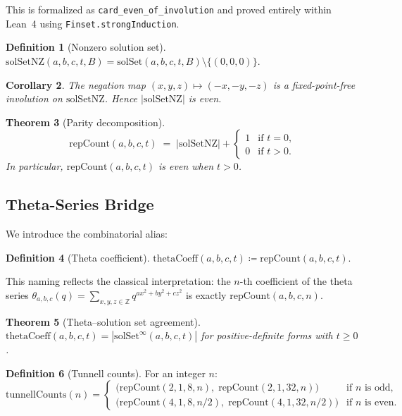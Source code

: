 \documentclass[11pt,a4paper]{article}
\newtheorem{theorem}{Theorem}[section]
\newtheorem{corollary}[theorem]{Corollary}
\theoremstyle{definition}
\newtheorem{definition}[theorem]{Definition}
\newcommand{\Z}{\mathbb{Z}}
\newcommand{\lean}[1]{\texttt{#1}}
\newcommand{\solSet}{\mathrm{solSet}}
\newcommand{\repCount}{\mathrm{repCount}}
\newcommand{\solSetInf}{\mathrm{solSet}^{\infty}}
\begin{document}
This is formalized as \lean{card\_even\_of\_involution} and
proved entirely within Lean~4 using \lean{Finset.strongInduction}.

\begin{definition}[Nonzero solution set]
$\mathrm{solSetNZ}(a,b,c,t,B) = \solSet(a,b,c,t,B) \setminus \{(0,0,0)\}$.
\end{definition}

\begin{corollary}\label{cor:even-nonzero}
The negation map $(x,y,z) \mapsto (-x,-y,-z)$ is a
fixed-point-free involution on $\mathrm{solSetNZ}$.  Hence
$|\mathrm{solSetNZ}|$ is even.
\end{corollary}

\begin{theorem}[Parity decomposition]\label{thm:parity}
\[
  \repCount(a,b,c,t) \;=\;
  |\mathrm{solSetNZ}| + \begin{cases} 1 & \text{if } t = 0,\\ 0 & \text{if } t > 0.\end{cases}
\]
In particular, $\repCount(a,b,c,t)$ is even when $t > 0$.
\end{theorem}

\subsection{Theta-Series Bridge}\label{sec:s5}

We introduce the combinatorial alias:

\begin{definition}[Theta coefficient]
$\mathrm{thetaCoeff}(a,b,c,t) \coloneqq \repCount(a,b,c,t)$.
\end{definition}

This naming reflects the classical interpretation: the $n$-th
coefficient of the theta series
$\theta_{a,b,c}(q) = \sum_{x,y,z \in \Z} q^{ax^2+by^2+cz^2}$
is exactly $\repCount(a,b,c,n)$.

\begin{theorem}[Theta--solution set agreement]\label{thm:theta-sol}
$\mathrm{thetaCoeff}(a,b,c,t) = |\solSetInf(a,b,c,t)|$ for
positive-definite forms with $t \ge 0$.
\end{theorem}

\begin{definition}[Tunnell counts]\label{def:tunnell-counts}
For an integer $n$:
\[
  \mathrm{tunnellCounts}(n) =
  \begin{cases}
    \bigl(\repCount(2,1,8,n),\; \repCount(2,1,32,n)\bigr)
      & \text{if } n \text{ is odd},\\[4pt]
    \bigl(\repCount(4,1,8,n/2),\; \repCount(4,1,32,n/2)\bigr)
      & \text{if } n \text{ is even}.
  \end{cases}
\]
\end{definition}
\end{document}
